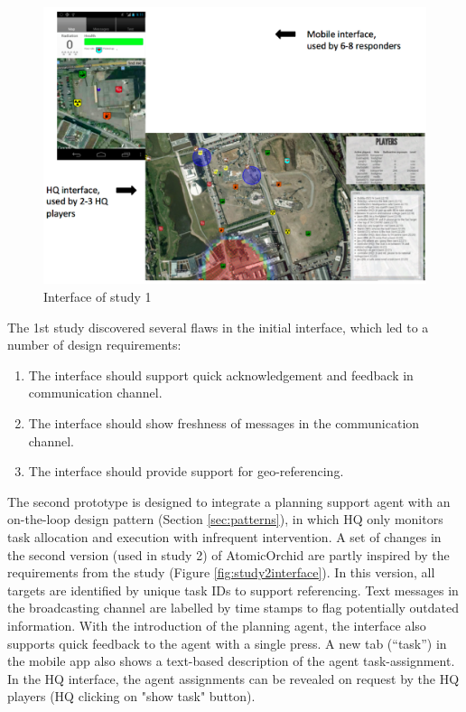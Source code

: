 \begin{figure}[H]
  \centering
  \includegraphics[width=1\textwidth]{img/conclusion/study1interface}
  \caption{Interface of study 1}
  \label{fig:study1interface}
\end{figure}



The 1st study discovered several flaws in the initial interface, which led to a number of design requirements: 

\begin{enumerate}
	 \item The interface should support quick acknowledgement and feedback in communication channel.
	 \item The interface should show freshness of messages in the communication channel.
	 \item The interface should provide support for geo-referencing.
\end{enumerate}

The second prototype is designed to integrate a planning support agent with an on-the-loop design pattern (Section \ref{sec:patterns}), in which HQ only monitors task allocation and execution with infrequent intervention. A set of changes in the second version (used in study 2) of AtomicOrchid are partly inspired by the requirements from the study (Figure \ref{fig:study2interface}). In this version, all targets are identified by unique task IDs to support referencing. Text messages in the broadcasting channel are labelled by time stamps to flag potentially outdated information. With the introduction of the planning agent, the interface also supports quick feedback to the agent with a single press. A new tab (``task'') in the mobile app also shows a text-based description of the agent task-assignment. In the HQ interface, the agent assignments can be revealed on request by the HQ players (HQ clicking on "show task" button).\\

